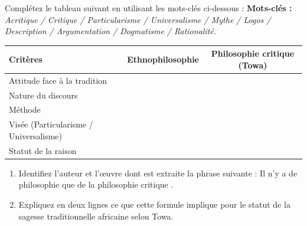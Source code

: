 \documentclass[11pt]{article}
\begin{document}
\begin{exercice}
Complétez le tableau suivant en utilisant les mots-clés ci-dessous :
\textbf{Mots-clés :} \textit{Acritique / Critique / Particularisme / Universalisme / Mythe / Logos / Description / Argumentation / Dogmatisme / Rationalité.}

\begin{tabular}{|l|c|c|}
\hline
\textbf{Critères} & \textbf{Ethnophilosophie} & \textbf{Philosophie critique (Towa)} \\
\hline
Attitude face à la tradition & & \\
\hline
Nature du discours & & \\
\hline
Méthode & & \\
\hline
Visée (Particularisme / Universalisme) & & \\
\hline
Statut de la raison & & \\
\hline
\end{tabular}
\end{exercice}

\begin{exercice}
\begin{enumerate}
    \item Identifiez l'auteur et l'œuvre dont est extraite la phrase suivante : \og Il n'y a de philosophie que de la philosophie critique \fg{}.
    \item Expliquez en deux lignes ce que cette formule implique pour le statut de la \og sagesse traditionnelle \fg{} africaine selon Towa.
\end{enumerate}
\end{exercice}
\end{document}
